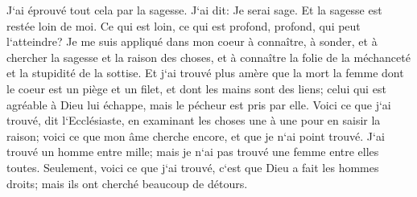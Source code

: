 \verse J`ai éprouvé tout cela par la sagesse. J`ai dit: Je serai sage. Et la sagesse est restée loin de moi. 
\verse Ce qui est loin, ce qui est profond, profond, qui peut l`atteindre? 
\verse Je me suis appliqué dans mon coeur à connaître, à sonder, et à chercher la sagesse et la raison des choses, et à connaître la folie de la méchanceté et la stupidité de la sottise. 
\verse Et j`ai trouvé plus amère que la mort la femme dont le coeur est un piège et un filet, et dont les mains sont des liens; celui qui est agréable à Dieu lui échappe, mais le pécheur est pris par elle. 
\verse Voici ce que j`ai trouvé, dit l`Ecclésiaste, en examinant les choses une à une pour en saisir la raison; 
\verse voici ce que mon âme cherche encore, et que je n`ai point trouvé. J`ai trouvé un homme entre mille; mais je n`ai pas trouvé une femme entre elles toutes. 
\verse Seulement, voici ce que j`ai trouvé, c`est que Dieu a fait les hommes droits; mais ils ont cherché beaucoup de détours. 


